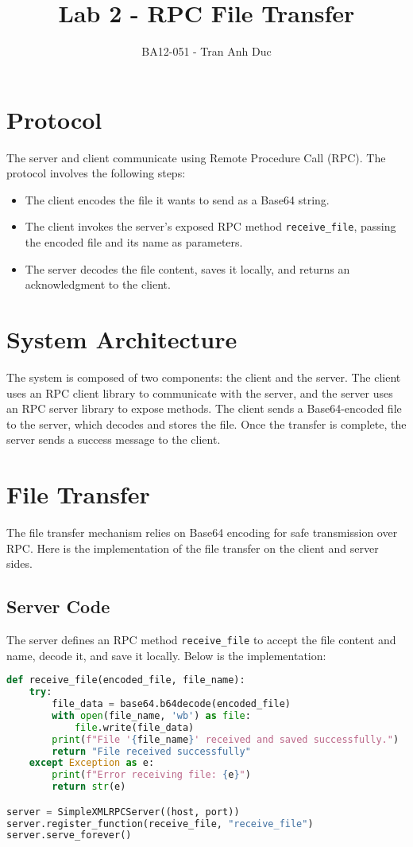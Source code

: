 \documentclass[a4paper,12pt]{article}
\title{Lab 2 - RPC File Transfer}
\author{BA12-051 - Tran Anh Duc}
\begin{document}
\maketitle

\section{Protocol}
The server and client communicate using Remote Procedure Call (RPC). The protocol involves the following steps:
\begin{itemize}
    \item The client encodes the file it wants to send as a Base64 string.
    \item The client invokes the server's exposed RPC method \texttt{receive\_file}, passing the encoded file and its name as parameters.
    \item The server decodes the file content, saves it locally, and returns an acknowledgment to the client.
\end{itemize}

\section{System Architecture}
The system is composed of two components: the client and the server. The client uses an RPC client library to communicate with the server, and the server uses an RPC server library to expose methods. The client sends a Base64-encoded file to the server, which decodes and stores the file. Once the transfer is complete, the server sends a success message to the client.

\section{File Transfer}
The file transfer mechanism relies on Base64 encoding for safe transmission over RPC. Here is the implementation of the file transfer on the client and server sides.

\subsection{Server Code}
The server defines an RPC method \texttt{receive\_file} to accept the file content and name, decode it, and save it locally. Below is the implementation:

\begin{lstlisting}[language=Python]
def receive_file(encoded_file, file_name):
    try:
        file_data = base64.b64decode(encoded_file)
        with open(file_name, 'wb') as file:
            file.write(file_data)
        print(f"File '{file_name}' received and saved successfully.")
        return "File received successfully"
    except Exception as e:
        print(f"Error receiving file: {e}")
        return str(e)

server = SimpleXMLRPCServer((host, port))
server.register_function(receive_file, "receive_file")
server.serve_forever()
\end{lstlisting}
\end{document}
